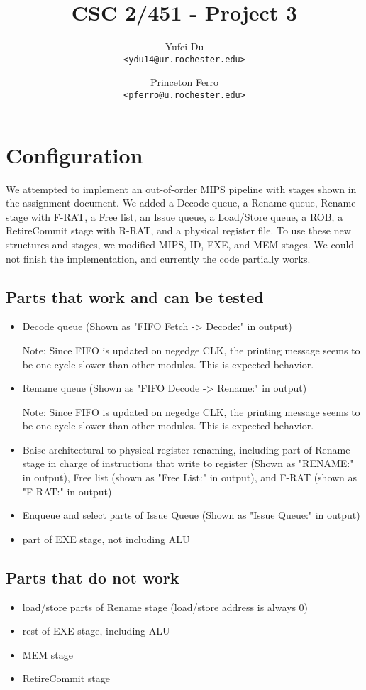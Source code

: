 \documentclass[a4paper,11pt]{article}
\title{CSC 2/451 - Project 3}
\author{
Yufei Du \\
\texttt{<ydu14@ur.rochester.edu>}
\and
Princeton Ferro \\
\texttt{<pferro@u.rochester.edu>}
}
\begin{document}
\maketitle

\section{Configuration}
We attempted to implement an out-of-order MIPS pipeline with stages shown in the assignment document. We added a Decode queue, a Rename queue, Rename stage with F-RAT, a Free list, an Issue queue, a Load/Store queue, a ROB, a RetireCommit stage with R-RAT, and a physical register file. To use these new structures and stages, we modified MIPS, ID, EXE, and MEM stages. We could not finish the implementation, and currently the code partially works.
\subsection{Parts that work and can be tested}
\begin{itemize}
  \item Decode queue (Shown as "FIFO Fetch -> Decode:" in output)
    \begin{sloppypar}
      Note: Since FIFO is updated on negedge CLK, the printing message seems to be one cycle slower than other modules. This is expected behavior.
    \end{sloppypar}
  \item Rename queue (Shown as "FIFO Decode -> Rename:" in output)
    \begin{sloppypar}
      Note: Since FIFO is updated on negedge CLK, the printing message seems to be one cycle slower than other modules. This is expected behavior.
    \end{sloppypar}
  \item Baisc architectural to physical register renaming, including part of Rename stage in charge of instructions that write to register (Shown as "RENAME:" in output), Free list (shown as "Free List:" in output), and F-RAT (shown as "F-RAT:" in output)
  \item Enqueue and select parts of Issue Queue (Shown as "Issue Queue:" in output)
  \item part of EXE stage, not including ALU
\end{itemize}
\subsection{Parts that do not work}
\begin{itemize}
  \item load/store parts of Rename stage (load/store address is always 0)
  \item rest of EXE stage, including ALU
  \item MEM stage
  \item RetireCommit stage
\end{itemize}
\end{document}
